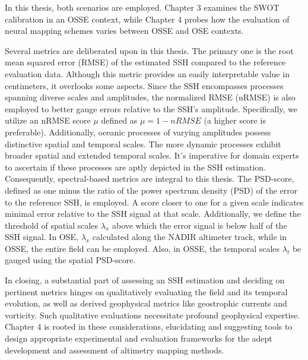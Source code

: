 \begin{bibunit}
In this thesis, both scenarios are employed. Chapter 3 examines the SWOT calibration in an OSSE context, while Chapter 4 probes how the evaluation of neural mapping schemes varies between OSSE and OSE contexts.

Several metrics are deliberated upon in this thesis. The primary one is the root mean squared error (RMSE) of the estimated SSH compared to the reference evaluation data. Although this metric provides an easily interpretable value in centimeters, it overlooks some aspects. Since the SSH encompasses processes spanning diverse scales and amplitudes, the normalized RMSE (nRMSE) is also employed to better gauge errors relative to the SSH's amplitude. Specifically, we utilize an nRMSE score $\mu$ defined as $\mu=1 - nRMSE$ (a higher score is preferable). Additionally, oceanic processes of varying amplitudes possess distinctive spatial and temporal scales. The more dynamic processes exhibit broader spatial and extended temporal scales. It's imperative for domain experts to ascertain if these processes are aptly depicted in the SSH estimation. Consequently, spectral-based metrics are integral to this thesis. The PSD-score, defined as one minus the ratio of the power spectrum density (PSD) of the error to the reference SSH, is employed. A score closer to one for a given scale indicates minimal error relative to the SSH signal at that scale. Additionally, we define the threshold of spatial scales $\lambda_x$ above which the error signal is below half of the SSH signal. In OSE, $\lambda_x$ calculated along the NADIR altimeter track, while in OSSE, the entire field can be employed. Also, in OSSE, the temporal scales $\lambda_t$ be gauged using the spatial PSD-score.

In closing, a substantial part of assessing an SSH estimation and deciding on pertinent metrics hinges on qualitatively evaluating the field and its temporal evolution, as well as derived geophysical metrics like geostrophic currents and vorticity. Such qualitative evaluations necessitate profound geophysical expertise. Chapter 4 is rooted in these considerations, elucidating and suggesting tools to design appropriate experimental and evaluation frameworks for the adept development and assessment of altimetry mapping methods.




\end{bibunit}

